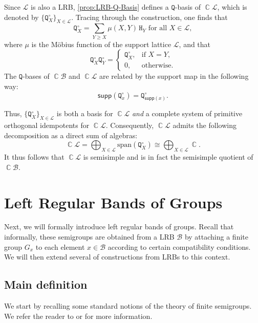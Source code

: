 \documentclass[11pt, oneside, reqno]{amsart}
\theoremstyle{definition}
\numberwithin{equation}{section}
\DeclareMathOperator{\C}{\mathbb{C}}
\def \BB{{\mathcal{B}}}
\def \kk{\C}
\def \lat{{\mathcal{L}}}
\def \supp{\mathsf{supp}}
\newcommand{\B}[1]{\mathtt{#1}} 			%
\begin{document}
Since $\lat$ is also a LRB, \cref{prop:LRB-Q-Basis} defines a $\B{Q}$-basis of $\kk\lat$,
which is denoted by $\{\B{Q}^\circ_{X}\}_{X \in \lat}$.
Tracing through the construction, one finds that
\begin{equation*}
    \B{Q}^\circ_X = \sum_{Y \geq X} \mu(X,Y) \, \B{H}_Y \text{ for all } X \in \lat,
\end{equation*}
where $\mu$ is the Möbius function of the support lattice $\lat$,
and that
\[
    \B{Q}^\circ_{X} \B{Q}^\circ_{Y} =
    \begin{cases}
        \B{Q}^\circ_{X}, & \text{if } X = Y, \\
        0,               & \text{otherwise.}
    \end{cases}
\]
The $\B{Q}$-bases of $\kk\BB$ and $\kk\lat$ are related by the support map in
the following way:
\begin{equation} \label{support-of-Q-basis}
    \supp(\B{Q}^\circ_{x}) = \B{Q}^\circ_{\supp(x)}.
\end{equation}

Thus, $\{\B{Q}^\circ_{X}\}_{X \in \lat}$ is both a basis for $\kk\lat$
\emph{and} a complete system of primitive orthogonal idempotents for $\kk\lat$.
Consequently, $\kk\lat$ admits the following decomposition as a direct sum of
algebras:
\begin{equation*}
    \kk\lat = \bigoplus_{X \in \lat} \mathrm{span}(\B{Q}^\circ_{X}) \cong \bigoplus_{X \in \lat} \kk.
\end{equation*}
It thus follows that $\kk\lat$ is semisimple and is in fact the semisimple quotient
of $\kk\BB$.

\section{Left Regular Bands of Groups}\label{sec:LRBG}

Next, we will formally introduce left regular bands of groups. Recall that informally, these semigroups are obtained from a LRB $\BB$ by attaching a finite group $G_x$ to each element $x \in \BB$ according to certain compatibility conditions.
We will then extend several of constructions from LRBs to this context.

\subsection{Main definition}

We start by recalling some standard notions of the theory of finite semigroups.
We refer the reader to \citep{clifford} or \citep[Appendix A]{RhSt09Semigroups} for more information.
\end{document}
